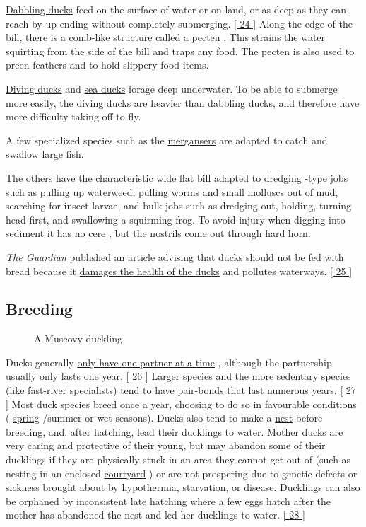 \documentclass[11pt,a4paper]{article}
\begin{document}
\href{/wiki/Dabbling\_duck}{Dabbling ducks} feed on the surface of water or on land, or as deep as they can reach by up-ending without completely submerging. \href{\#cite\_note-24}{[ 24 ]} Along the edge of the bill, there is a comb-like structure called a \href{/wiki/Pecten\_(biology)}{pecten} . This strains the water squirting from the side of the bill and traps any food. The pecten is also used to preen feathers and to hold slippery food items.

\href{/wiki/Diving\_duck}{Diving ducks} and \href{/wiki/Sea\_duck}{sea ducks} forage deep underwater. To be able to submerge more easily, the diving ducks are heavier than dabbling ducks, and therefore have more difficulty taking off to fly.

A few specialized species such as the \href{/wiki/Merganser}{mergansers} are adapted to catch and swallow large fish.

The others have the characteristic wide flat bill adapted to \href{/wiki/Dredging}{dredging} -type jobs such as pulling up waterweed, pulling worms and small molluscs out of mud, searching for insect larvae, and bulk jobs such as dredging out, holding, turning head first, and swallowing a squirming frog. To avoid injury when digging into sediment it has no \href{/wiki/Cere}{cere} , but the nostrils come out through hard horn.

\href{/wiki/The\_Guardian}{\textit{The Guardian}} published an article advising that ducks should not be fed with bread because it \href{/wiki/Angel\_wing}{damages the health of the ducks} and pollutes waterways. \href{\#cite\_note-25}{[ 25 ]}

\subsection{Breeding}

\begin{figure}[h]
\caption{A Muscovy duckling}
\end{figure}

Ducks generally \href{/wiki/Monogamy\_in\_animals}{only have one partner at a time} , although the partnership usually only lasts one year. \href{\#cite\_note-26}{[ 26 ]} Larger species and the more sedentary species (like fast-river specialists) tend to have pair-bonds that last numerous years. \href{\#cite\_note-27}{[ 27 ]} Most duck species breed once a year, choosing to do so in favourable conditions ( \href{/wiki/Spring\_(season)}{spring} /summer or wet seasons). Ducks also tend to make a \href{/wiki/Bird\_nest}{nest} before breeding, and, after hatching, lead their ducklings to water. Mother ducks are very caring and protective of their young, but may abandon some of their ducklings if they are physically stuck in an area they cannot get out of (such as nesting in an enclosed \href{/wiki/Courtyard}{courtyard} ) or are not prospering due to genetic defects or sickness brought about by hypothermia, starvation, or disease. Ducklings can also be orphaned by inconsistent late hatching where a few eggs hatch after the mother has abandoned the nest and led her ducklings to water. \href{\#cite\_note-28}{[ 28 ]}
\end{document}
